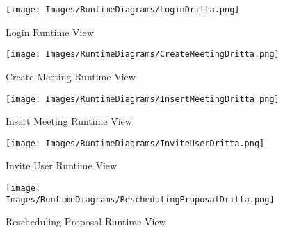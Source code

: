 

\begin{figure}[h]
	\centering\texttt{[image: Images/RuntimeDiagrams/LoginDritta.png]}
	\caption{Login Runtime View}
\end{figure}

\begin{figure}[h]
	\centering\texttt{[image: Images/RuntimeDiagrams/CreateMeetingDritta.png]}
	\caption{Create Meeting Runtime View}
\end{figure}

\begin{figure}[h]
	\centering\texttt{[image: Images/RuntimeDiagrams/InsertMeetingDritta.png]}
	\caption{Insert Meeting Runtime View}
\end{figure}

\begin{figure}[h]
	\centering\texttt{[image: Images/RuntimeDiagrams/InviteUserDritta.png]}
	\caption{Invite User Runtime View}
\end{figure}

\begin{figure}[h]
\centering\texttt{[image: Images/RuntimeDiagrams/ReschedulingProposalDritta.png]}
\caption{Rescheduling Proposal Runtime View}
\end{figure}

\clearpage